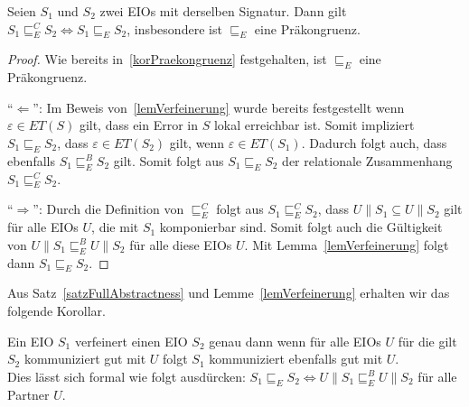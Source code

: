 \begin{satz}
  \label{satzFullAbstractness}
  Seien $S_1$ und $S_2$ zwei EIOs mit derselben Signatur. Dann gilt $S_1\sqsubseteq
  _E^C S_2\Leftrightarrow S_1\sqsubseteq _E S_2$, insbesondere ist $\sqsubseteq _E$
  eine Präkongruenz.
\end{satz}

\begin{proof}
  Wie bereits in~\ref{korPraekongruenz} festgehalten, ist $\sqsubseteq _E$ eine
  Präkongruenz.

  ``$\Leftarrow$'': Im Beweis von~\ref{lemVerfeinerung} wurde bereits festgestellt wenn
      $\varepsilon\in ET(S)$ gilt, dass ein Error in $S$ lokal erreichbar ist.
      Somit impliziert $S_1\sqsubseteq _E S_2$, dass $\varepsilon\in
      ET(S_2)$ gilt, wenn $\varepsilon\in ET(S_1)$. Dadurch folgt auch, dass
      ebenfalls $S_1\sqsubseteq _E^B S_2$ gilt. Somit folgt aus $S_1\sqsubseteq
      _E S_2$ der relationale Zusammenhang $S_1\sqsubseteq _E^C S_2$.

  ``$\Rightarrow$'': Durch die Definition von $\sqsubseteq _E^C$ folgt aus
  $S_1\sqsubseteq _E^C S_2$, dass $U\|S_1\subseteq U\|S_2$ gilt für alle EIOs $U$, die mit
  $S_1$ komponierbar sind. Somit folgt auch die Gültigkeit von
  $U\|S_1\sqsubseteq _E^B U\|S_2$ für alle diese EIOs $U$. Mit
  Lemma~\ref{lemVerfeinerung} folgt dann $S_1\sqsubseteq _E S_2$.
\end{proof}

Aus Satz~\ref{satzFullAbstractness} und Lemme~\ref{lemVerfeinerung} erhalten
wir das folgende Korollar.

\begin{kor}
  Ein EIO $S_1$ verfeinert einen EIO $S_2$ genau dann wenn für alle EIOs $U$
  für die gilt $S_2$ kommuniziert gut mit $U$ folgt $S_1$ kommuniziert
  ebenfalls gut mit $U$.\\
  Dies lässt sich formal wie folgt ausdürcken: $S_1\sqsubseteq _E S_2
  \Leftrightarrow U\|S_1\sqsubseteq _E^B U\|S_2$ für alle Partner $U$.
\end{kor}
